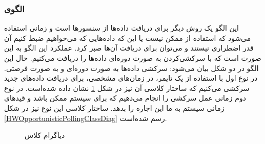 \subsubsection{الگوی }
\label{HWPollingSec}
\begin{RTL}
این الگو یک روش دیگر برای دریافت داده‌ها از سنسورها است و زمانی استفاده می‌شود که
استفاده از  ممکن نیست یا این که
داده‌هایی که می‌خواهیم ضبط کنیم آن قدر اضطراری نیستند و می‌توان برای دریافت آن‌ها
صبر کرد. عملکرد این الگو به این صورت است که با سرکشی‌کردن به صورت دوره‌ای داده‌ها
را دریافت می‌کنیم. حال این الگو در دو شکل بیان می‌شود: سرکشی داده‌ها به صورت
دوره‌ای و به صورت فرصتی.
در نوع اول با استفاده از یک تایمر، در زمان‌های مشخصی، برای دریافت داده‌های جدید
سرکشی می‌کنیم که ساختار کلاسی آن نیز
در شکل \ref{HWPeriodicPollingClassDiag} نشان داده شده‌است.
در نوع دوم زمانی عمل سرکشی را انجام می‌دهیم که برای سیستم ممکن باشد و
قیدهای زمانی سیستم به ما این اجاره را بدهد. ساختار کلاسی این نوع نیز در شکل
\ref{HWOpportunisticPollingClassDiag} رسم شده‌است.
\end{RTL}
\begin{figure}[h!]
\centering
{}
\caption{دیاگرام کلاس }
\label{HWPeriodicPollingClassDiag}
\end{figure}


